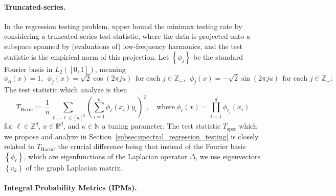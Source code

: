 \documentclass{article}
\newcommand{\Reals}{\mathbb{R}}
\newcommand{\set}[1]{\left\{#1\right\}}
\newcommand{\1}{\mathbf{1}}
\theoremstyle{alden}
\theoremstyle{aldenthm}
\theoremstyle{definition}
\theoremstyle{remark}
\begin{document}
\paragraph{Truncated-series.}

In the regression testing problem, \citet{ingster09} upper bound the minimax testing rate by considering a truncated series test statistic, where the data is projected onto a subspace spanned by (evaluations of) low-frequency harmonics, and the test statistic is the empirical norm of this projection. Let $\set{\phi_j}$ be the standard Fourier basis in $L_2([0,1])$, meaning
\begin{equation*}
\phi_0(x) = 1,~~ \phi_j(x) = \sqrt{2}\cos(2\pi j u) ~~\textrm{for each $j \in \mathbb{Z}_{-}$},~~ \phi_j(x) = -\sqrt{2}\sin(2\pi j u) ~~\textrm{for each $j \in \mathbb{Z}_{+}$}:
\end{equation*}
The test statistic which \citet{ingster09} analyze is then
\begin{equation}
\label{eqn:harmonic}
T_{\mathrm{Harm}} := \frac{1}{n}\sum_{\ell,-\ell \in [\kappa]^d} \left(\sum_{i = 1}^{n} \phi_{\ell}(x_i) y_i\right)^2, \quad \textrm{where}~ \phi_{\ell}(x) = \prod_{i = 1}^{d} \phi_{\ell_i}(x_i)
\end{equation}
for $\ell \in \mathbb{Z}^d$, $x \in \Reals^d$, and 
$\kappa \in \mathbb{N}$ a tuning parameter. The test statistic $T_{\mathrm{spec}}$ which we propose and analyze in Section~\ref{subsec:spectral_regression_testing} is closely related to $T_{\mathrm{Harm}}$, the crucial difference being that instead of the Fourier basis $\set{\phi_{\ell}}$, which are eigenfunctions of the Laplacian operator $\Delta$, we use eigenvectors $\set{v_k}$ of the graph Laplacian matrix.

\paragraph{Integral Probability Metrics (IPMs).}
\end{document}
